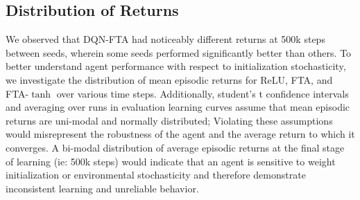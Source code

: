\documentclass{article}
\begin{document}
\subsection{Distribution of Returns} \label{sub-sec:distribution}
We observed that DQN-FTA had noticeably different returns at 500k steps between seeds, wherein some seeds performed significantly better than others. 
To better understand agent performance with respect to initialization stochasticity, we investigate the distribution of mean episodic returns for ReLU, FTA, and FTA-$\tanh$ over various time steps. 
Additionally, student's t confidence intervals and averaging over runs in evaluation learning curves assume that mean episodic returns are uni-modal and normally distributed; 
Violating these assumptions would misrepresent the robustness of the agent and the average return to which it converges. 
A bi-modal distribution of average episodic returns at the final stage of learning (ie: 500k steps) would indicate that an agent is sensitive to weight initialization or environmental stochasticity and therefore demonstrate inconsistent learning and unreliable behavior. 
\end{document}
